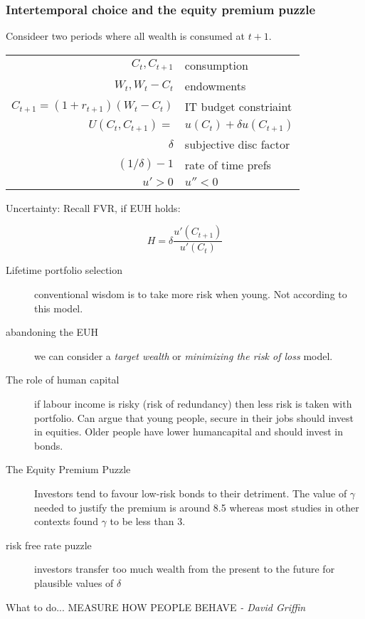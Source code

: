 \subsubsection*{Intertemporal choice and the equity premium puzzle}

Consideer two periods where  all wealth is consumed at $t+1$.

\begin{tabular}{rl}
$C_t, C_{t+1}$& consumption\\
$W_t, W_t-C_t$& endowments\\
$C_{t+1}=(1+r_{t+1})(W_t-C_t)$& IT budget constriaint\\
$U(C_t,C_{t+1})=$&$u(C_t)+\delta u(C_{t+1})$\\
$\delta$& subjective disc factor\\
$(1/\delta)-1$& rate of time prefs\\
$u'>0$&$u''<0$\\
\end{tabular}

Uncertainty: Recall FVR, if EUH holds:

\[H=\delta\frac{u'(C_{t+1})}{u'(C_t)}\]
\begin{description}
\item[Lifetime portfolio selection] conventional wisdom is to take more risk
when young. Not according to this model.

\item[abandoning the EUH] we can consider a \emph{target wealth} or
\emph{minimizing the risk of loss} model.

\item[The role of human capital] if labour income is risky (risk of redundancy)
then less risk is taken with portfolio. Can argue that young people, secure in
their jobs should invest in equities. Older people have lower humancapital and
should invest in bonds.

\item[The Equity Premium Puzzle] Investors tend to favour low-risk bonds to
their detriment. The value of $\gamma$ needed to justify the premium is around
8.5 whereas most studies in other contexts found $\gamma$ to be less than 3.

\item[risk free rate puzzle] investors transfer too much wealth from the
present to the future for plausible values of $\delta$

\end{description}

What to do... MEASURE HOW PEOPLE BEHAVE \emph{ - David Griffin}

